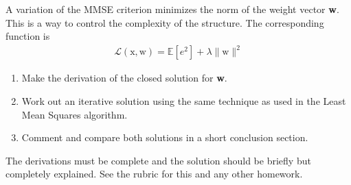 \documentclass[11pt]{article}
\begin{document}






A variation of the MMSE criterion minimizes the norm of the weight vector \textbf{w}. This is a way to control the complexity of the structure. The corresponding function is
\begin{align*}
    \mathcal{L}\left(\bm{\mathrm {x,w}}\right)=\mathbb{E}\left[e^2 \right]+\lambda \parallel \bm{\mathrm {w}}\parallel ^2
\end{align*}
\begin{enumerate}
    \item Make the derivation of the closed solution for \textbf{w}.
    \item Work out an iterative solution using the same technique as used in the Least Mean Squares algorithm.
    \item Comment and compare both solutions in a short conclusion section.
\end{enumerate}
The derivations must be complete and the solution should be briefly but completely explained. See the rubric for this and any other homework.
\end{document}
